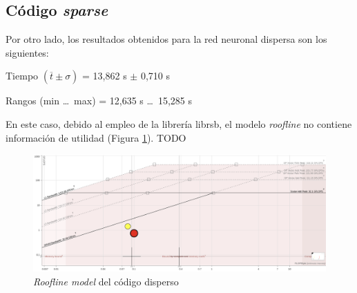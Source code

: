 \subsection{Código \textit{sparse}}
Por otro lado, los resultados obtenidos para la red neuronal dispersa son los siguientes:

\begin{center}
Tiempo $(\overline{t} \pm \sigma)$ = 13,862 s $\pm$ 0,710 s

Rangos (min \ldots\ max) = 12,635 s \ldots\ 15,285 s
\end{center}

En este caso, debido al empleo de la librería librsb, el modelo \textit{roofline} no contiene información de utilidad (Figura \ref{fig:roofline_sparse_details}). TODO

\begin{figure}[h!]
    \centering
    \includegraphics[width=\textwidth]{img/roofline_sparse.png}
    \caption{\textit{Roofline model} del código disperso}
    \label{fig:roofline_sparse_details}
\end{figure}